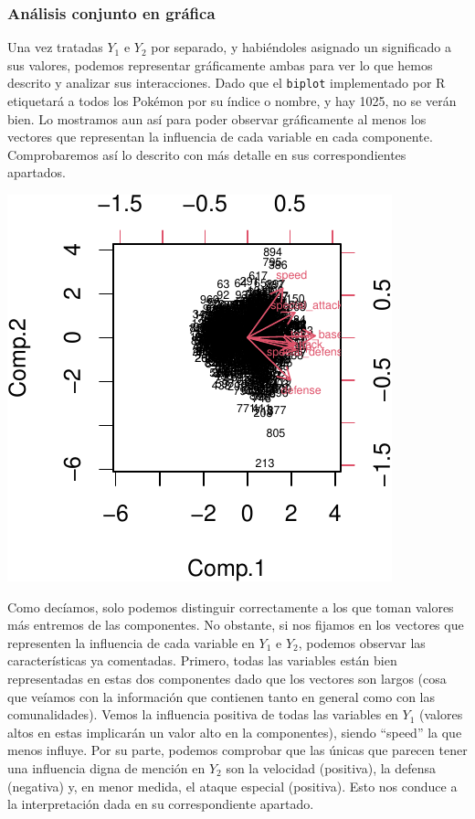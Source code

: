 \documentclass[
  11.8pt,
]{extreport}
\begin{document}
\subsubsection{Análisis conjunto en
gráfica}\label{anuxe1lisis-conjunto-en-gruxe1fica}

Una vez tratadas \(Y_1\) e \(Y_2\) por separado, y habiéndoles asignado
un significado a sus valores, podemos representar gráficamente ambas
para ver lo que hemos descrito y analizar sus interacciones. Dado que el
\texttt{biplot} implementado por R etiquetará a todos los Pokémon por su
índice o nombre, y hay 1025, no se verán bien. Lo mostramos aun así para
poder observar gráficamente al menos los vectores que representan la
influencia de cada variable en cada componente. Comprobaremos así lo
descrito con más detalle en sus correspondientes apartados.

\begin{center}
\includegraphics{trabajo_files/figure-pdf/unnamed-chunk-37-1.pdf}
\end{center}

Como decíamos, solo podemos distinguir correctamente a los que toman
valores más entremos de las componentes. No obstante, si nos fijamos en
los vectores que representen la influencia de cada variable en \(Y_1\) e
\(Y_2\), podemos observar las características ya comentadas. Primero,
todas las variables están bien representadas en estas dos componentes
dado que los vectores son largos (cosa que veíamos con la información
que contienen tanto en general como con las comunalidades). Vemos la
influencia positiva de todas las variables en \(Y_1\) (valores altos en
estas implicarán un valor alto en la componentes), siendo ``speed'' la
que menos influye. Por su parte, podemos comprobar que las únicas que
parecen tener una influencia digna de mención en \(Y_2\) son la
velocidad (positiva), la defensa (negativa) y, en menor medida, el
ataque especial (positiva). Esto nos conduce a la interpretación dada en
su correspondiente apartado.
\end{document}
